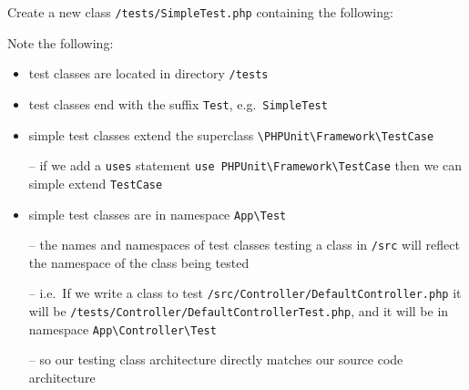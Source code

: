 \documentclass[a4paperpaper,openright]{book}
\newenvironment{Shaded}{}{}
\newcommand{\CommentTok}[1]{\textcolor[rgb]{0.38,0.63,0.69}{\textit{#1}}}
\newcommand{\DecValTok}[1]{\textcolor[rgb]{0.25,0.63,0.44}{#1}}
\newcommand{\KeywordTok}[1]{\textcolor[rgb]{0.00,0.44,0.13}{\textbf{#1}}}
\newcommand{\NormalTok}[1]{#1}
\newcommand{\OtherTok}[1]{\textcolor[rgb]{0.00,0.44,0.13}{#1}}
\begin{document}
Create a new class \texttt{/tests/SimpleTest.php} containing the
following:

\begin{Shaded}
\end{Shaded}

Note the following:

\begin{itemize}
\item
  test classes are located in directory \texttt{/tests}
\item
  test classes end with the suffix \texttt{Test},
  e.g.~\texttt{SimpleTest}
\item
  simple test classes extend the superclass
  \texttt{\textbackslash{}PHPUnit\textbackslash{}Framework\textbackslash{}TestCase}

  -- if we add a \texttt{uses} statement
  \texttt{use\ PHPUnit\textbackslash{}Framework\textbackslash{}TestCase}
  then we can simple extend \texttt{TestCase}
\item
  simple test classes are in namespace \texttt{App\textbackslash{}Test}

  -- the names and namespaces of test classes testing a class in
  \texttt{/src} will reflect the namespace of the class being tested

  -- i.e.~If we write a class to test
  \texttt{/src/Controller/DefaultController.php} it will be
  \texttt{/tests/Controller/DefaultControllerTest.php}, and it will be
  in namespace
  \texttt{App\textbackslash{}Controller\textbackslash{}Test}

  -- so our testing class architecture directly matches our source code
  architecture
\end{itemize}
\end{document}
